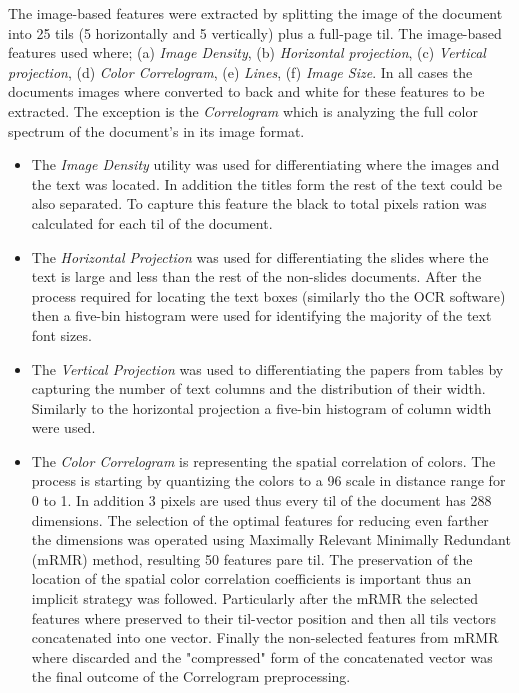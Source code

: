 The image-based features were extracted by splitting the image of the document into 25 tils (5 horizontally and 5 vertically) plus a full-page til. The image-based features used where; (a) \textit{Image Density}, (b) \textit{Horizontal projection}, (c) \textit{Vertical projection}, (d) \textit{Color Correlogram}, (e) \textit{Lines}, (f) \textit{Image Size}. In all cases the documents images where converted to back and white for these features to be extracted. The exception is the \textit{Correlogram} which is analyzing the full color spectrum of the document's in its image format.

\begin{itemize}
\item The \textit{Image Density} utility was used for differentiating where the images and the text was located. In addition the titles form the rest of the text could be also separated. To capture this feature the black to total pixels ration was calculated for each til of the document. 
\item The \textit{Horizontal Projection} was used for differentiating the slides where the text is large and less than the rest of the non-slides documents. After the process required for locating the text boxes (similarly tho the OCR software) then a five-bin histogram were used for identifying the majority of the text font sizes.
\item The \textit{Vertical Projection} was used to differentiating the papers from tables by capturing the number of text columns and the distribution of their width. Similarly to the horizontal projection a five-bin histogram of column width were used.
\item The \textit{Color Correlogram} is representing the spatial correlation of colors. The process is starting by quantizing the colors to a 96 scale in distance range for 0 to 1. In addition 3 pixels are used thus every til of the document has 288 dimensions. The selection of the optimal features for reducing even farther the dimensions was operated using Maximally Relevant Minimally Redundant (mRMR) method, resulting 50 features pare til. The preservation of the location of the spatial color correlation coefficients is important thus an implicit strategy was followed. Particularly after the mRMR the selected features where preserved to their til-vector position and then all tils vectors concatenated into one vector. Finally the non-selected features from mRMR where discarded and the "compressed" form of the concatenated vector was the final outcome of the Correlogram preprocessing.

\end{itemize}

